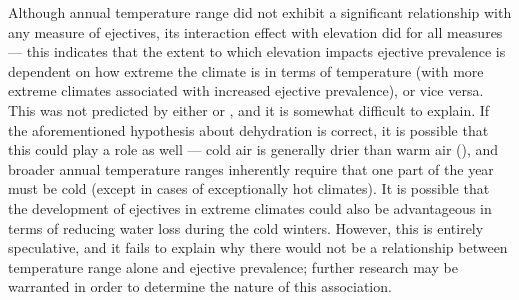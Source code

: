 \documentclass{article}
\begin{document}
Although annual temperature range did not exhibit a significant relationship with any measure of ejectives, its interaction effect with elevation did for all measures --- this indicates that the extent to which elevation impacts ejective prevalence is dependent on how extreme the climate is in terms of temperature (with more extreme climates associated with increased ejective prevalence), or vice versa. This was not predicted by either \textcite{everett2013} or \textcite{urban2021}, and it is somewhat difficult to explain. If the aforementioned hypothesis about dehydration is correct, it is possible that this could play a role as well --- cold air is generally drier than warm air (\cite{koskela2007}), and broader annual temperature ranges inherently require that one part of the year must be cold (except in cases of exceptionally hot climates). It is possible that the development of ejectives in extreme climates could also be advantageous in terms of reducing water loss during the cold winters. However, this is entirely speculative, and it fails to explain why there would not be a relationship between temperature range alone and ejective prevalence; further research may be warranted in order to determine the nature of this association.
\end{document}
